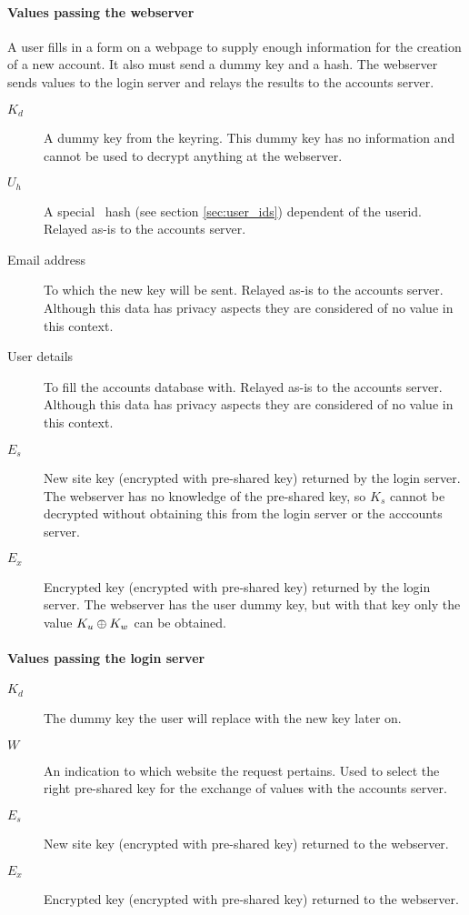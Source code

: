 \paragraph{Values passing the webserver}
A user fills in a form on a webpage to supply enough information for the creation of a new account.
It also must send a dummy key and a hash.
The webserver sends values to the login server and relays the results to the accounts server.
\begin{description}
\item[$K_d$]	A dummy key from the keyring.
	This dummy key has no information and cannot be used to decrypt anything at the webserver.
\item[$U_h$]	A special \SHA\ hash (see section \ref{sec:user_ids}) dependent of the userid.
	Relayed as-is to the accounts server.
\item[Email address]	To which the new key will be sent.
	Relayed as-is to the accounts server.
	Although this data has privacy aspects they are considered of no value in this context.
\item[User details]	To fill the accounts database with.
	Relayed as-is to the accounts server.
	Although this data has privacy aspects they are considered of no value in this context.
\item[$E_s$]	New site key (encrypted with pre-shared key) returned by the login server.
	The webserver has no knowledge of the pre-shared key,
	so $K_s$ cannot be decrypted without obtaining this from the login server or the acccounts server.
\item[$E_x$]	Encrypted key (encrypted with pre-shared key) returned by the login server.
	The webserver has the user dummy key,
	but with that key only the value $K_u\oplus K_w$ can be obtained.
\end{description}
\paragraph{Values passing the login server}
\begin{description}
\item[$K_d$]	The dummy key the user will replace with the new key later on.
\item[$W$]	An indication to which website the request pertains.
	Used to select the right pre-shared key for the exchange of values with the accounts server.
\item[$E_s$]	New site key (encrypted with pre-shared key) returned to the webserver.
\item[$E_x$]	Encrypted key (encrypted with pre-shared key) returned to the webserver.
\end{description}

